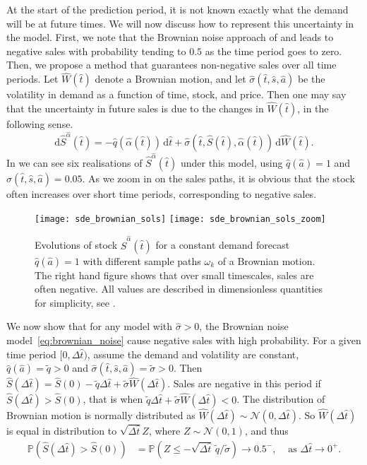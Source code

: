 \documentclass[main.tex]{subfiles}
\begin{document}
At the start of the prediction period, it is not known exactly what
the demand will be at future times. We will now discuss how to
represent this uncertainty in the model. First, we note that the Brownian noise
approach of \citet{raman1995optimal} and \citet{wu2016dynamic} leads to negative
sales with probability tending to $0.5$ as the time period goes to zero.
Then, we propose a method that guarantees non-negative sales over all
time periods.
Let $\hat{W}(\hat{t})$ denote a Brownian motion, and let $\hat{\sigma}(\hat{t},\hat{s},\hat{a})$ be the volatility
in demand as a function of time, stock, and price. Then
one may say that the uncertainty in future
sales is due to the changes in $\hat{W}(\hat{t})$, in the following sense.
\begin{equation}\label{eq:brownian_noise}
  \mathrm{d}\hat{S}^{\hat{\alpha}}(\hat{t}) =
  -\hat{q}(\hat{\alpha}(\hat{t}))\,\mathrm{d}\hat{t} +
  \hat{\sigma}(\hat{t},\hat{S}(\hat{t}),\hat{\alpha}(\hat{t}))\,\mathrm{d}\hat{W}(\hat{t}).
\end{equation}
In  we can see six realisations of
$\hat{S}^{\hat{\alpha}}(\hat{t})$ under
this model, using $\hat{q}(\hat{a})=1$ and $\hat{\sigma}(\hat{t},\hat{s},\hat{a})=0.05$. As we zoom in on
the sales paths, it is obvious that the stock often
increases over short time periods, corresponding to negative sales.
\begin{figure}[htbp]
  \centering
  \texttt{[image: sde\_brownian\_sols]}%
  \texttt{[image: sde\_brownian\_sols\_zoom]}
  \caption{Evolutions of stock $\hat{S}^{\hat{\alpha}}(\hat{t})$ for a constant
    demand forecast $\hat{q}(\hat{a})=1$ with different sample paths $\omega_k$
    of a Brownian motion.
    The right hand figure shows that over small timescales, sales are
    often negative.
    All values are described in dimensionless quantities for
    simplicity, see .
  }\label{fig:brownian_paths}
\end{figure}
We now show that for any model with $\hat{\sigma}>0$, the Brownian noise
model~\eqref{eq:brownian_noise} cause negative sales with high
probability.
For a given time period $[0,\Delta{\hat{t}})$, assume the demand and volatility are constant,
$\hat{q}(\hat{a})=\tilde q>0$ and $\hat{\sigma}(\hat{t},\hat{s},\hat{a})=\tilde \sigma>0$.
Then $\hat{S}(\Delta{\hat{t}})=\hat{S}(0)-\tilde q\Delta{\hat{t}} + \tilde{\sigma} \hat{W}(\Delta{\hat{t}})$.
Sales are negative in this period if $\hat{S}(\Delta{\hat{t}})>\hat{S}(0)$, that is when
$\tilde{q}\Delta{\hat{t}}+\tilde{\sigma} \hat{W}(\Delta{\hat{t}}) < 0$.
The distribution of Brownian motion is normally distributed as
$\hat{W}(\Delta{\hat{t}})\sim \mathcal{N}(0,\Delta{\hat{t}})$. So $\hat{W}(\Delta{\hat{t}})$ is equal in
distribution to $\sqrt{\Delta{\hat{t}}}Z$, where $Z\sim \mathcal{N}(0,1)$, and thus
\begin{align}
  \mathbb{P}(\hat{S}(\Delta{\hat{t}})>\hat{S}(0))
  &=\mathbb{P}(Z\leq -\sqrt{\Delta{\hat{t}}}\,\tilde q / \tilde \sigma)
    \to 0.5^-,& \text{ as } \Delta{\hat{t}} \to 0^+.
\end{align}
\end{document}

